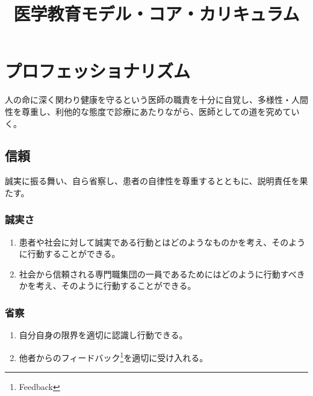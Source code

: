 \documentclass[
]{ltjsarticle}
\title{医学教育モデル・コア・カリキュラム}
\author{}
\date{}
\providecommand{\tightlist}{%
  \setlength{\itemsep}{0pt}\setlength{\parskip}{0pt}}
\begin{document}
\maketitle

{
\setcounter{tocdepth}{3}
\tableofcontents
}
\newpage

\hypertarget{ux30d7ux30edux30d5ux30a7ux30c3ux30b7ux30e7ux30caux30eaux30baux30e0}{%
\section{プロフェッショナリズム}\label{ux30d7ux30edux30d5ux30a7ux30c3ux30b7ux30e7ux30caux30eaux30baux30e0}}

人の命に深く関わり健康を守るという医師の職責を十分に自覚し、多様性・人間性を尊重し、利他的な態度で診療にあたりながら、医師としての道を究めていく。

\hypertarget{ux4fe1ux983c}{%
\subsection{信頼}\label{ux4fe1ux983c}}

誠実に振る舞い、自ら省察し、患者の自律性を尊重するとともに、説明責任を果たす。

\hypertarget{ux8aa0ux5b9fux3055}{%
\subsubsection{誠実さ}\label{ux8aa0ux5b9fux3055}}

\begin{enumerate}
\def\labelenumi{\arabic{enumi}.}
\tightlist
\item
  患者や社会に対して誠実である行動とはどのようなものかを考え、そのように行動することができる。
\item
  社会から信頼される専門職集団の一員であるためにはどのように行動すべきかを考え、そのように行動することができる。
\end{enumerate}

\hypertarget{ux7701ux5bdf}{%
\subsubsection{省察}\label{ux7701ux5bdf}}

\begin{enumerate}
\def\labelenumi{\arabic{enumi}.}
\tightlist
\item
  自分自身の限界を適切に認識し行動できる。
\item
  他者からのフィードバック\footnote{Feedback}を適切に受け入れる。
\end{enumerate}
\end{document}
